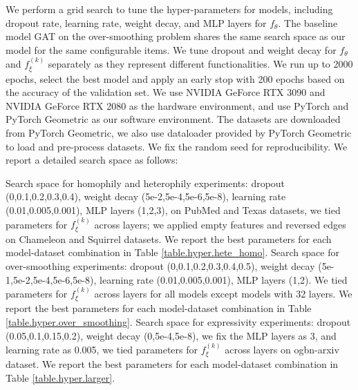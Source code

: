 \documentclass{article}
\begin{document}
We perform a grid search to tune the hyper-parameters for models, including dropout rate, learning rate, weight decay, and MLP layers for $f_{\theta}$. The baseline model GAT on the over-smoothing problem shares the same search space as our model for the same configurable items. We tune dropout and weight decay for $f_{\theta}$ and $f_{\xi}^{(k)}$ separately as they represent different functionalities. We run up to 2000 epochs, select the best model and apply an early stop with 200 epochs based on the accuracy of the validation set. We use NVIDIA GeForce RTX 3090 and NVIDIA GeForce RTX 2080 as the hardware environment, and use PyTorch and PyTorch Geometric as our software environment. The datasets are downloaded from PyTorch Geometric, we also use dataloader provided by PyTorch Geometric to load and pre-process datasets. We fix the random seed for reproducibility. We report a detailed search space as follows:

Search space for homophily and heterophily experiments: dropout (0,0.1,0.2,0.3,0.4), weight decay (5e-2,5e-4,5e-6,5e-8), learning rate (0.01,0.005,0.001), MLP layers (1,2,3), on PubMed and Texas datasets, we tied parameters for $f_{\xi}^{(k)}$ across layers; we applied empty features \citep{zhu2020graph} and reversed edges on Chameleon and Squirrel datasets. We report the best parameters for each model-dataset combination in Table \ref{table.hyper.hete_homo}. Search space for over-smoothing experiments: dropout (0,0.1,0.2,0.3,0.4,0.5), weight decay (5e-1,5e-2,5e-4,5e-6,5e-8), learning rate (0.01,0.005,0.001), MLP layers (1,2). We tied parameters for $f_{\xi}^{(k)}$ across layers for all models except models with 32 layers. We report the best parameters for each model-dataset combination in Table \ref{table.hyper.over_smoothing}. Search space for expressivity experiments: dropout (0.05,0.1,0.15,0.2), weight decay (0,5e-4,5e-8), we fix the MLP layers as 3, and learning rate as 0.005, we tied parameters for $f_{\xi}^{(k)}$ across layers on ogbn-arxiv dataset. We report the best parameters for each model-dataset combination in Table \ref{table.hyper.larger}.
\end{document}
